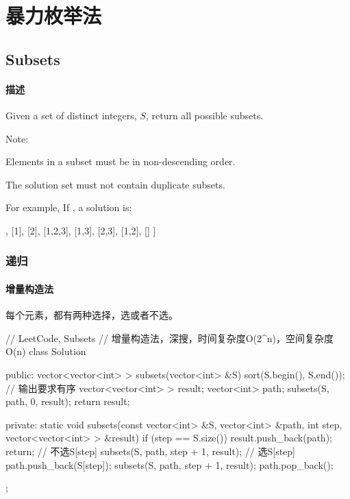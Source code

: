 \chapter{暴力枚举法}


\section{Subsets} %
\label{sec:subsets}


\subsubsection{描述}
Given a set of distinct integers, $S$, return all possible subsets.

Note:
\begindot
\item Elements in a subset must be in non-descending order.
\item The solution set must not contain duplicate subsets.
\myenddot

For example, If , a solution is:
\begin{Code}
[
  [3],
  [1],
  [2],
  [1,2,3],
  [1,3],
  [2,3],
  [1,2],
  []
]
\end{Code}


\subsection{递归}


\subsubsection{增量构造法}
每个元素，都有两种选择，选或者不选。

\begin{Code}
// LeetCode, Subsets
// 增量构造法，深搜，时间复杂度O(2^n)，空间复杂度O(n)
class Solution {
public:
    vector<vector<int> > subsets(vector<int> &S) {
        sort(S.begin(), S.end());  // 输出要求有序
        vector<vector<int> > result;
        vector<int> path;
        subsets(S, path, 0, result);
        return result;
    }

private:
    static void subsets(const vector<int> &S, vector<int> &path, int step,
            vector<vector<int> > &result) {
        if (step == S.size()) {
            result.push_back(path);
            return;
        }
        // 不选S[step]
        subsets(S, path, step + 1, result);
        // 选S[step]
        path.push_back(S[step]);
        subsets(S, path, step + 1, result);
        path.pop_back();
    }
};
\end{Code}


